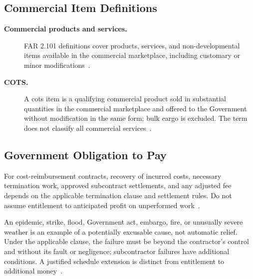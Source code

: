 \documentclass[../main.tex]{subfiles}
\begin{document}
\subsection{Commercial Item Definitions}
\begin{description}
  \item[\textbf{Commercial products and services.}] FAR 2.101 definitions cover products, services, and non-developmental items available in the commercial marketplace, including customary or minor modifications~\autocite{FAR-2-101-Definitions,edo-3-2-6-contract-administration-2025}.
  \item[\textbf{COTS.}] A \ac{cots} item is a qualifying commercial product sold in substantial quantities in the commercial marketplace and offered to the Government without modification in the same form; bulk cargo is excluded. The term does not classify all commercial services~\autocite{FAR-2-101-Definitions,edo-3-2-6-contract-administration-2025}.
\end{description}

\subsection{Government Obligation to Pay}
For cost-reimbursement contracts, recovery of incurred costs, necessary termination work, approved subcontract settlements, and any adjusted fee depends on the applicable termination clause and settlement rules. Do not assume entitlement to anticipated profit on unperformed work~\autocite{edo-3-2-6-contract-administration-2025,FAR-Overhaul-Part49-2026}.

An epidemic, strike, flood, Government act, embargo, fire, or unusually severe weather is an example of a potentially excusable cause, not automatic relief. Under the applicable clause, the failure must be beyond the contractor's control and without its fault or negligence; subcontractor failures have additional conditions. A justified schedule extension is distinct from entitlement to additional money~\autocite{FAR-52-249-14-Excusable-Delays,edo-3-2-6-contract-administration-2025}.
\end{document}
